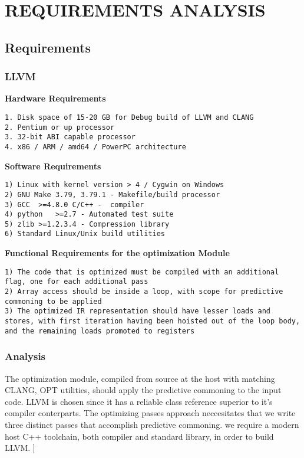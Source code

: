 
\chapter{REQUIREMENTS ANALYSIS} %

\section{Requirements}
\subsection{LLVM}
\textbf{Hardware Requirements}
\begin{verbatim}
1. Disk space of 15-20 GB for Debug build of LLVM and CLANG
2. Pentium or up processor
3. 32-bit ABI capable processor
4. x86 / ARM / amd64 / PowerPC architecture
\end{verbatim}
\textbf{Software Requirements}
\begin{verbatim}
1) Linux with kernel version > 4 / Cygwin on Windows
2) GNU Make	3.79, 3.79.1 - Makefile/build processor
3) GCC	>=4.8.0	C/C++ -  compiler
4) python	>=2.7 -	Automated test suite
5) zlib	>=1.2.3.4 -	Compression library 
6) Standard Linux/Unix build utilities
\end{verbatim}
\textbf{Functional Requirements for the optimization Module}
\begin{verbatim}
1) The code that is optimized must be compiled with an additional flag, one for each additional pass
2) Array access should be inside a loop, with scope for predictive commoning to be applied
3) The optimized IR representation should have lesser loads and stores, with first iteration having been hoisted out of the loop body, and the remaining loads promoted to registers
\end{verbatim}
\subsection{Analysis}
The optimization module, compiled from source at the host with matching CLANG, OPT utilities, should apply the predictive commoning to the input code. LLVM is chosen since it has a reliable class reference superior to it's compiler conterparts. The optimizing passes approach neccesitates that we write three distinct passes that accomplish predictive commoning.  we require a modern host C++ toolchain, both compiler and standard library, in order to build LLVM.
]